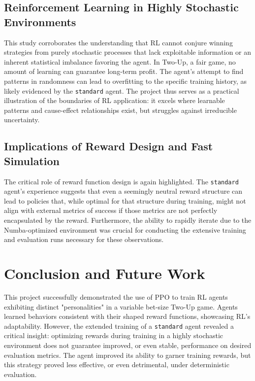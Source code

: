 \documentclass{article}
\begin{document}
\subsection{Reinforcement Learning in Highly Stochastic Environments}
This study corroborates the understanding that RL cannot conjure winning strategies from purely stochastic processes that lack exploitable information or an inherent statistical imbalance favoring the agent. In Two-Up, a fair game, no amount of learning can guarantee long-term profit. The agent's attempt to find patterns in randomness can lead to overfitting to the specific training history, as likely evidenced by the \texttt{standard} agent. The project thus serves as a practical illustration of the boundaries of RL application: it excels where learnable patterns and cause-effect relationships exist, but struggles against irreducible uncertainty.

\subsection{Implications of Reward Design and Fast Simulation}
The critical role of reward function design is again highlighted. The \texttt{standard} agent's experience suggests that even a seemingly neutral reward structure can lead to policies that, while optimal for that structure during training, might not align with external metrics of success if those metrics are not perfectly encapsulated by the reward. Furthermore, the ability to rapidly iterate due to the Numba-optimized environment was crucial for conducting the extensive training and evaluation runs necessary for these observations.

\section{Conclusion and Future Work}

This project successfully demonstrated the use of PPO to train RL agents exhibiting distinct "personalities" in a variable bet-size Two-Up game. Agents learned behaviors consistent with their shaped reward functions, showcasing RL's adaptability. However, the extended training of a \texttt{standard} agent revealed a critical insight: optimizing rewards during training in a highly stochastic environment does not guarantee improved, or even stable, performance on desired evaluation metrics. The agent improved its ability to garner training rewards, but this strategy proved less effective, or even detrimental, under deterministic evaluation.
\end{document}
